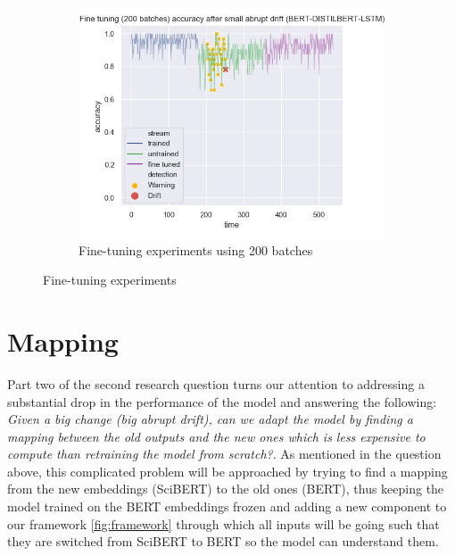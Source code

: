 \documentclass[12pt]{extreport}
\begin{document}
\begin{figure}[H]
\begin{subfigure}{.55\textwidth}
\centering
\includegraphics[width=\linewidth]{assets/addressing-change/fine_tuning_lstm_wos_1_BERT_DISTILBERT_200_batches.png}
\caption{Fine-tuning experiments using 200 batches}
\label{fig:fine200}
\end{subfigure}
\caption{Fine-tuning experiments}
\label{fig:fine}
\end{figure}

\cleardoublepage
\section{Mapping} \label{sec:map}

Part two of the second research question turns our attention to addressing a substantial drop in the performance of the model and answering the following: \emph{Given a big change (big abrupt drift), can we adapt the model by finding a mapping between the old outputs and the new ones which is less expensive to compute than retraining the model from scratch?}. As mentioned in the question above, this complicated problem will be approached by trying to find a mapping from the new embeddings (SciBERT) to the old ones (BERT), thus keeping the model trained on the BERT embeddings frozen and adding a new component to our framework \ref{fig:framework} through which all inputs will be going such that they are switched from SciBERT to BERT so the model can understand them.
\end{document}
